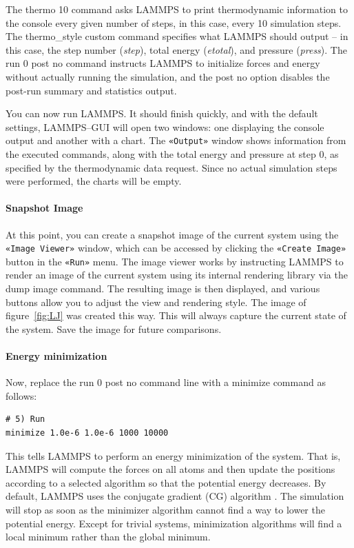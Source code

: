 \documentclass[9pt,tutorial]{livecoms}
\newcommand{\lmpcmd}[1]{\hspace{0pt}\colorbox{listing}{\textcolor{command}{\small{#1}}}\hspace{0pt}} %
\newcommand{\guicmd}[1]{\textcolor{command}{\texttt{«#1»}}} %
\begin{document}
The \lmpcmd{thermo 10} command asks LAMMPS to print thermodynamic
information to the console every given number of steps, in this case,
every 10 simulation steps.  The \lmpcmd{thermo\_style custom} command
specifies what LAMMPS should output -- in this case, the step number
(\textit{step}), total energy (\textit{etotal}), and pressure (\textit{press}).
The \lmpcmd{run 0 post no} command instructs LAMMPS to initialize forces and energy
without actually running the simulation, and the \lmpcmd{post no} option disables
the post-run summary and statistics output.

You can now run LAMMPS.  It should finish quickly, and with the default
settings, LAMMPS--GUI will open two windows: one displaying the console
output and another with a chart.  The \guicmd{Output} window shows information from
the executed commands, along with the total energy and pressure at step 0,
as specified by the thermodynamic data request.  Since no actual simulation
steps were performed, the charts will be empty.

\paragraph{Snapshot Image}

At this point, you can create a snapshot image of the
current system using the \guicmd{Image Viewer} window, which can be
accessed by clicking the \guicmd{Create Image} button in the \guicmd{Run} menu.
The image viewer works by instructing LAMMPS to render an image of the current system using
its internal rendering library via the \lmpcmd{dump image} command.  The
resulting image is then displayed, and various buttons allow you to adjust
the view and rendering style.  The image of
figure~\ref{fig:LJ} was created this way.  This will always capture the current
state of the system.  Save the image for future comparisons.

\paragraph{Energy minimization}

Now, replace the \lmpcmd{run 0 post no} command line with a \lmpcmd{minimize}
command as follows:
\begin{lstlisting}
# 5) Run
minimize 1.0e-6 1.0e-6 1000 10000
\end{lstlisting}

This tells LAMMPS to perform an energy minimization of the system.  That
is, LAMMPS will compute the forces on all atoms and then update the
positions according to a selected algorithm so that the potential energy
decreases.  By default, LAMMPS uses the conjugate gradient (CG)
algorithm \cite{hestenes1952methods}.  The simulation will stop as soon
as the minimizer algorithm cannot find a way to lower the potential
energy.  Except for trivial systems, minimization algorithms will find a
local minimum rather than the global minimum.
\end{document}
